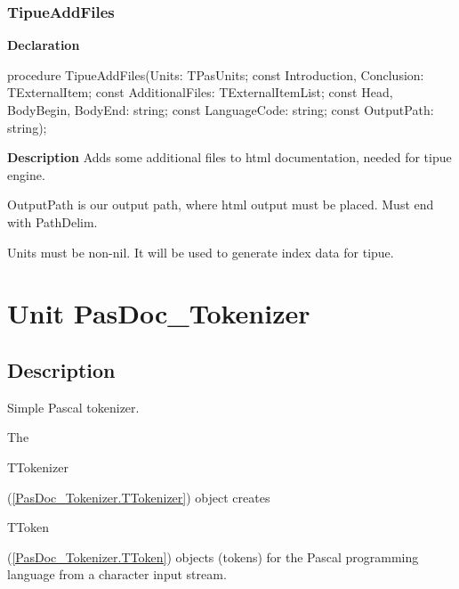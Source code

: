 \documentclass{report}
\newif\ifpdf
\begin{document}
\subsection*{TipueAddFiles}
\fi
\label{PasDoc_Tipue-TipueAddFiles}
\begin{list}{}{
\setlength{\itemindent}{0cm}
\setlength{\listparindent}{0cm}
\setlength{\leftmargin}{\evensidemargin}
\addtolength{\leftmargin}{\tmplength}
\settowidth{\labelsep}{X}
\addtolength{\leftmargin}{\labelsep}
\setlength{\labelwidth}{\tmplength}
}
\item[\textbf{Declaration}\hfill]
\ifpdf
\begin{flushleft}
\fi
\begin{ttfamily}
procedure TipueAddFiles(Units: TPasUnits; const Introduction, Conclusion: TExternalItem; const AdditionalFiles: TExternalItemList; const Head, BodyBegin, BodyEnd: string; const LanguageCode: string; const OutputPath: string);\end{ttfamily}

\ifpdf
\end{flushleft}
\fi

\par
\item[\textbf{Description}]
Adds some additional files to html documentation, needed for tipue engine.

OutputPath is our output path, where html output must be placed. Must end with PathDelim.

Units must be non{-}nil. It will be used to generate index data for tipue.

\end{list}
\chapter{Unit PasDoc{\_}Tokenizer}
\label{PasDoc_Tokenizer}
\section{Description}
Simple Pascal tokenizer.\hfill\vspace*{1ex}

     

The \begin{ttfamily}TTokenizer\end{ttfamily}(\ref{PasDoc_Tokenizer.TTokenizer}) object creates \begin{ttfamily}TToken\end{ttfamily}(\ref{PasDoc_Tokenizer.TToken}) objects (tokens) for the Pascal programming language from a character input stream.
\end{document}

